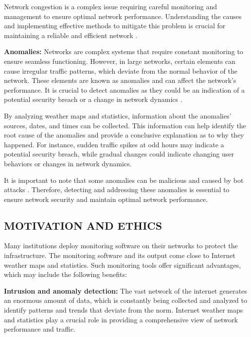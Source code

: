 \documentclass[sigconf,authorversion,nonacm]{acmart}
\begin{document}
Network congestion is a complex issue requiring careful monitoring and management to ensure optimal network performance. Understanding the causes and implementing effective methods to mitigate this problem is crucial for maintaining a reliable and efficient network \cite{TIAN201084}.

\textbf{Anomalies:} Networks are complex systems that require constant monitoring to ensure seamless functioning. However, in large networks, certain elements can cause irregular traffic patterns, which deviate from the normal behavior of the network. These elements are known as anomalies and can affect the network's performance. It is crucial to detect anomalies as they could be an indication of a potential security breach or a change in network dynamics \cite{WAWROWSKI20212259}.

By analyzing weather maps and statistics, information about the anomalies' sources, dates, and times can be collected. This information can help identify the root cause of the anomalies and provide a conclusive explanation as to why they happened. For instance, sudden traffic spikes at odd hours may indicate a potential security breach, while gradual changes could indicate changing user behaviors or changes in network dynamics.

It is important to note that some anomalies can be malicious and caused by bot attacks \cite{6524462}. Therefore, detecting and addressing these anomalies is essential to ensure network security and maintain optimal network performance.

\subsection{MOTIVATION AND ETHICS}
Many institutions deploy monitoring software on their networks to protect the infrastructure. The monitoring software and its output come close to Internet weather maps and statistics. Such monitoring tools offer significant advantages, which may include the following benefits:

\textbf{Intrusion and anomaly detection:} The vast network of the internet generates an enormous amount of data, which is constantly being collected and analyzed to identify patterns and trends that deviate from the norm. Internet weather maps and statistics play a crucial role in providing a comprehensive view of network performance and traffic. 
\end{document}
